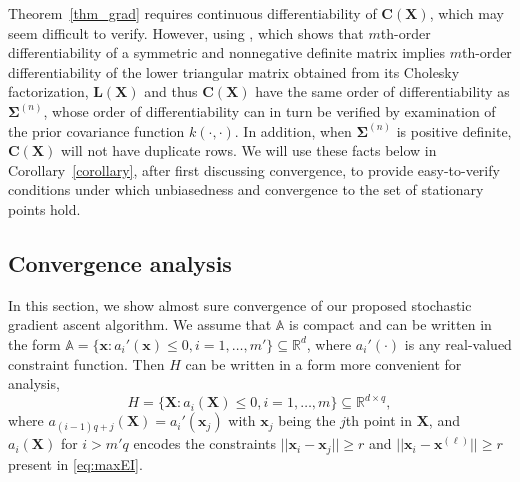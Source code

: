 \documentclass[paper=letter]{scrartcl}
\newcommand{\Sig}[1]{\bm{\Sigma}^{(#1)}} %
\begin{document}
Theorem~\ref{thm_grad} requires continuous differentiability of $\bm{C}(\bm{X})$, which may seem difficult to verify. However, using \cite{smith1995differentiation}, which shows that $m$th-order differentiability of a 
symmetric and nonnegative definite matrix implies $m$th-order differentiability of the lower triangular matrix obtained from its Cholesky factorization, $\bm{L}(\bm{X})$ and thus $\bm{C}(\bm{X})$ have the same order of differentiability as $\Sig{n}$, whose order of differentiability can in turn be verified by examination of the prior covariance function $k(\cdot,\cdot)$. In addition, when $\Sig{n}$ is positive definite,  $\bm{C}(\bm{X})$ will not have duplicate rows.
We will use these facts below in Corollary~\ref{corollary}, after first discussing convergence, to provide easy-to-verify conditions under which unbiasedness and convergence to the set of stationary points hold.


\subsection{Convergence analysis} \label{sec:SGA_converge}
In this section, we show almost sure convergence of our proposed stochastic gradient ascent algorithm.
We assume that $\mathbb{A}$ is compact and can be written in the form 
$\mathbb{A} = \{\bm{x}: a_i'(\bm{x}) \leq 0, i=1, \ldots, m'\} \subseteq \mathbb{R}^{d}$, where $a_i'(\cdot)$ is any real-valued constraint function.
Then $H$ can be written in a form more convenient for analysis,
\begin{equation*}
H = \{\bm{X}: a_i(\bm{X}) \leq 0, i=1, \ldots, m\} \subseteq \mathbb{R}^{d \times q}, 
\end{equation*}
where $a_{(i-1)q+j}(\bm{X}) = a_i'(\bm{x}_j)$ with $\bm{x}_j$ being the $j$th point in $\bm{X}$,
and $a_i(\bm{X})$ for $i>m'q$ encodes the constraints $\lvert\lvert \bm{x}_i - \bm{x}_j \rvert\rvert \ge r$ and 
$\lvert\lvert \bm{x}_i - \bm{x}^{(\ell)} \rvert\rvert \ge r$ 
present in \eqref{eq:maxEI}.

\end{document}
